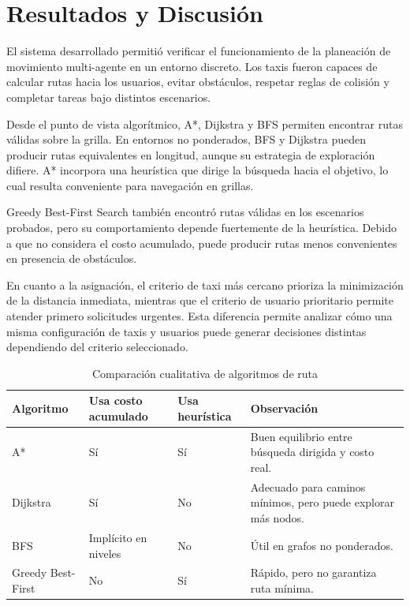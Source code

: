 \documentclass[12pt,a4paper]{article}
\begin{document}
\section{Resultados y Discusión}
\justifying

El sistema desarrollado permitió verificar el funcionamiento de la planeación de movimiento multi-agente en un entorno discreto. Los taxis fueron capaces de calcular rutas hacia los usuarios, evitar obstáculos, respetar reglas de colisión y completar tareas bajo distintos escenarios.

Desde el punto de vista algorítmico, A*, Dijkstra y BFS permiten encontrar rutas válidas sobre la grilla. En entornos no ponderados, BFS y Dijkstra pueden producir rutas equivalentes en longitud, aunque su estrategia de exploración difiere. A* incorpora una heurística que dirige la búsqueda hacia el objetivo, lo cual resulta conveniente para navegación en grillas.

Greedy Best-First Search también encontró rutas válidas en los escenarios probados, pero su comportamiento depende fuertemente de la heurística. Debido a que no considera el costo acumulado, puede producir rutas menos convenientes en presencia de obstáculos.

En cuanto a la asignación, el criterio de taxi más cercano prioriza la minimización de la distancia inmediata, mientras que el criterio de usuario prioritario permite atender primero solicitudes urgentes. Esta diferencia permite analizar cómo una misma configuración de taxis y usuarios puede generar decisiones distintas dependiendo del criterio seleccionado.

\begin{table}[H]
\centering
\caption{Comparación cualitativa de algoritmos de ruta}
\begin{tabular}{p{3cm} p{3cm} p{3cm} p{5cm}}
\toprule
\textbf{Algoritmo} & \textbf{Usa costo acumulado} & \textbf{Usa heurística} & \textbf{Observación} \\
\midrule
A* & Sí & Sí & Buen equilibrio entre búsqueda dirigida y costo real. \\
Dijkstra & Sí & No & Adecuado para caminos mínimos, pero puede explorar más nodos. \\
BFS & Implícito en niveles & No & Útil en grafos no ponderados. \\
Greedy Best-First & No & Sí & Rápido, pero no garantiza ruta mínima. \\
\bottomrule
\end{tabular}
\end{table}
\end{document}
